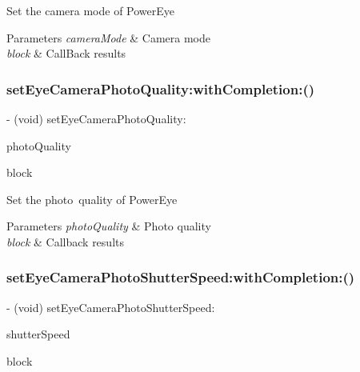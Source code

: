 Set the camera mode of Power\+Eye


\begin{DoxyParams}{Parameters}
{\em camera\+Mode} & Camera mode \\
\hline
{\em block} & Call\+Back results \\
\hline
\end{DoxyParams}
\mbox{\label{interface_p_v_camera_a42a0725334b3b2716d0ef349f50b5a46}} 
\subsubsection{\texorpdfstring{set\+Eye\+Camera\+Photo\+Quality\+:with\+Completion\+:()}{setEyeCameraPhotoQuality:withCompletion:()}}
{\footnotesize\ttfamily -\/ (void) set\+Eye\+Camera\+Photo\+Quality\+: \begin{DoxyParamCaption}\item[{(P\+V\+Eye\+Camera\+Photo\+Quality)}]{photo\+Quality }\item[{withCompletion:(P\+V\+Completion\+Block)}]{block }\end{DoxyParamCaption}}

Set the photo quality of Power\+Eye


\begin{DoxyParams}{Parameters}
{\em photo\+Quality} & Photo quality \\
\hline
{\em block} & Callback results \\
\hline
\end{DoxyParams}
\mbox{\label{interface_p_v_camera_a6b9e71327e59de9094258f617141b138}} 
\subsubsection{\texorpdfstring{set\+Eye\+Camera\+Photo\+Shutter\+Speed\+:with\+Completion\+:()}{setEyeCameraPhotoShutterSpeed:withCompletion:()}}
{\footnotesize\ttfamily -\/ (void) set\+Eye\+Camera\+Photo\+Shutter\+Speed\+: \begin{DoxyParamCaption}\item[{(P\+V\+Camera\+Photo\+Shutter\+Speed)}]{shutter\+Speed }\item[{withCompletion:(P\+V\+Completion\+Block)}]{block }\end{DoxyParamCaption}}

